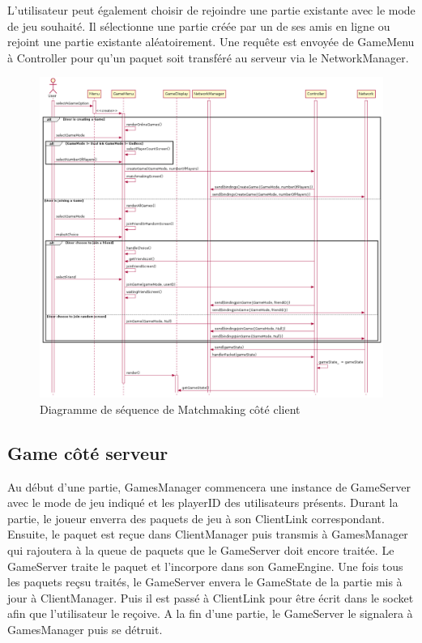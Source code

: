 \documentclass{article}
\begin{document}
L'utilisateur peut également choisir de rejoindre une partie existante avec le mode de jeu souhaité. Il sélectionne une partie créée par un de ses amis en ligne ou rejoint une partie existante aléatoirement. Une requête est envoyée de GameMenu à Controller pour qu'un paquet soit transféré au serveur via le NetworkManager.

\begin{figure}[H]
    \centering
    \includegraphics[width=1\textwidth]{../res/uml/sequence/MatchMakingClientSequence.png}
    \caption{Diagramme de séquence de Matchmaking côté client}
    \label{fig:MatchmakingClientDiagram}
\end{figure}

\subsection{Game côté serveur}

Au début d'une partie, GamesManager commencera une instance de GameServer avec le mode de jeu indiqué et les playerID des utilisateurs présents. Durant la partie, le joueur enverra des paquets de jeu à son ClientLink correspondant. Ensuite, le paquet est reçue dans ClientManager puis transmis à GamesManager qui rajoutera à la queue de paquets que le GameServer doit encore traitée. Le GameServer traite le paquet et l'incorpore dans son GameEngine. Une fois tous les paquets reçsu traités, le GameServer envera le GameState de la partie mis à jour à ClientManager. Puis il est passé à ClientLink pour être écrit dans le socket afin que l'utilisateur le reçoive. A la fin d'une partie, le GameServer le signalera à GamesManager puis se détruit.
\end{document}
